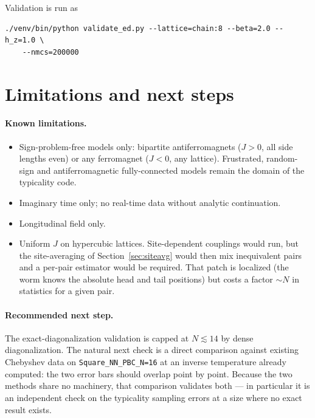 \documentclass[11pt,a4paper]{article}
\newcommand{\code}[1]{\texttt{#1}}
\begin{document}
Validation is run as
\begin{lstlisting}
./venv/bin/python validate_ed.py --lattice=chain:8 --beta=2.0 --h_z=1.0 \
    --nmcs=200000
\end{lstlisting}

\section{Limitations and next steps}

\paragraph{Known limitations.}
\begin{itemize}
  \item Sign-problem-free models only: bipartite antiferromagnets ($J>0$, all
    side lengths even) or any ferromagnet ($J<0$, any lattice). Frustrated,
    random-sign and antiferromagnetic fully-connected models remain the domain
    of the typicality code.
  \item Imaginary time only; no real-time data without analytic continuation.
  \item Longitudinal field only.
  \item Uniform $J$ on hypercubic lattices. Site-dependent couplings would run,
    but the site-averaging of Section~\ref{sec:siteavg} would then mix
    inequivalent pairs and a per-pair estimator would be required. That patch is
    localized (the worm knows the absolute head and tail positions) but costs a
    factor $\sim N$ in statistics for a given pair.
\end{itemize}

\paragraph{Recommended next step.} The exact-diagonalization validation is
capped at $N\lesssim14$ by dense diagonalization. The natural next check is a
direct comparison against existing Chebyshev data on
\code{Square\_NN\_PBC\_N=16} at an inverse temperature already computed: the two
error bars should overlap point by point. Because the two methods share no
machinery, that comparison validates both --- in particular it is an independent
check on the typicality sampling errors at a size where no exact result exists.
\end{document}
